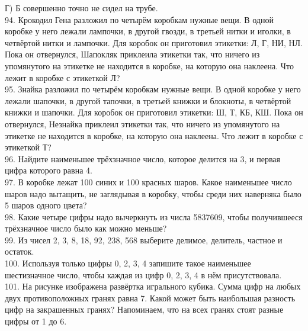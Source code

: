 \documentclass[12pt]{article}
\begin{document}
Г) Б совершенно точно не сидел на трубе.\\
94. Крокодил Гена разложил по четырём коробкам нужные вещи. В одной коробке у него лежали лампочки, в другой гвозди, в третьей нитки и иголки, в четвёртой нитки и лампочки. Для коробок он приготовил этикетки: Л, Г, НИ, НЛ. Пока он отвернулся, Шапокляк приклеила этикетки так, что ничего из упомянутого на этикетке не находится в коробке, на которую она наклеена. Что лежит в коробке с этикеткой Л?\\
95. Знайка разложил по четырём коробкам нужные вещи. В одной коробке у него лежали шапочки, в другой тапочки, в третьей книжки и блокноты, в четвёртой книжки и шапочки. Для коробок он приготовил этикетки: Ш, Т, КБ, КШ. Пока он отвернулся, Незнайка приклеил этикетки так, что ничего из упомянутого на этикетке не находится в коробке, на которую она наклеена. Что лежит в коробке с этикеткой Т?\\
96. Найдите наименьшее трёхзначное число, которое делится на 3, и первая цифра которого равна 4.\\
97. В коробке лежат 100 синих и 100 красных шаров. Какое наименьшее число шаров надо вытащить, не заглядывая в коробку, чтобы среди них наверняка было 5 шаров одного цвета?\\
98. Какие четыре цифры надо вычеркнуть из числа 5837609, чтобы получившееся трёхзначное число было как можно меньше?\\
99. Из чисел 2, 3, 8, 18, 92, 238, 568 выберите делимое, делитель, частное и остаток.\\
100. Используя только цифры 0, 2, 3, 4 запишите такое наименьшее шестизначное число, чтобы каждая из цифр 0, 2, 3, 4 в нём присутствовала.\\
101. На рисунке изображена развёртка игрального кубика. Сумма цифр на любых двух противоположных гранях равна 7. Какой может быть наибольшая разность цифр на закрашенных гранях? Напоминаем, что на всех гранях стоят разные цифры от 1 до 6.
\begin{center}
\begin{figure}[ht!]
\end{figure}
\end{center}
\end{document}
